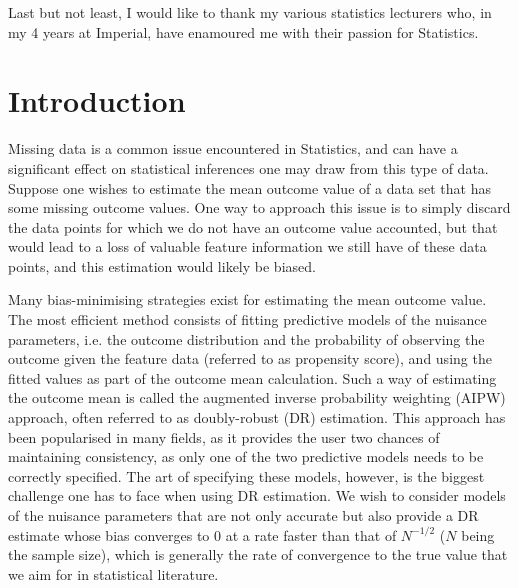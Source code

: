 \documentclass[12pt,twoside]{article}
\begin{document}
Last but not least, I would like to thank my various statistics lecturers who, in my 4 years at Imperial, have enamoured me with their passion for Statistics.

\clearpage{\pagestyle{empty}\cleardoublepage}

\tableofcontents 

\clearpage
\listoffigures
\listoftables

\clearpage
{}
\setcounter{page}{1}
\fancyhead[L]{\textsl{\leftmark}}

\section{Introduction} 

Missing data is a common issue encountered in Statistics, and can have a significant effect on statistical inferences one may draw from this type of data. Suppose one wishes to estimate the mean outcome value of a data set that has some missing outcome values. One way to approach this issue is to simply discard the data points for which we do not have an outcome value accounted, but that would lead to a loss of valuable feature information we still have of these data points, and this estimation would likely be biased.

Many bias-minimising strategies exist for estimating the mean outcome value. The most efficient method consists of fitting predictive models of the nuisance parameters, i.e. the outcome distribution and the probability of observing the outcome given the feature data (referred to as propensity score), and using the fitted values as part of the outcome mean calculation. Such a way of estimating the outcome mean is called the augmented inverse probability weighting (AIPW) approach, often referred to as doubly-robust (DR) estimation. This approach has been popularised in many fields, as it provides the user two chances of maintaining consistency, as only one of the two predictive models needs to be correctly specified. The art of specifying these models, however, is the biggest challenge one has to face when using DR estimation. We wish to consider models of the nuisance parameters that are not only accurate but also provide a DR estimate whose bias converges to 0 at a rate faster than that of $N^{-1/2}$ ($N$ being the sample size), which is generally the rate of convergence to the true value that we aim for in statistical literature.
\end{document}
